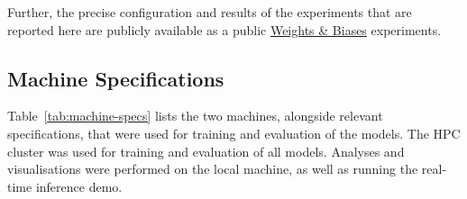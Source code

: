 \documentclass[a4paper]{article}
\begin{document}
Further, the precise configuration and results of the experiments that are
reported here are publicly available as a public
\href{https://wandb.ai/mikasenghaas/bsc}{Weights \& Biases} experiments.


\subsection{Machine Specifications} %
\label{sub:machine-specs}

Table~\ref{tab:machine-specs} lists the two machines, alongside relevant
specifications, that were used for training and evaluation of the models.
The HPC cluster was used for training and evaluation of all models. Analyses
and visualisations were performed on the local machine, as well as running the
real-time inference demo. 
\end{document}
